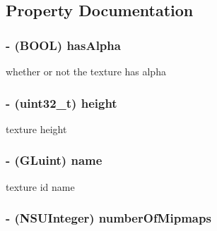 \subsection{Property Documentation}
\hypertarget{interface_c_c_texture_p_v_r_ae72c73a2de4c7c8db4484164a5e7c1ff}{
\subsubsection[{has\-Alpha}]{\setlength{\rightskip}{0pt plus 5cm}-\/ (B\-O\-O\-L) {\bf has\-Alpha}}}\label{interface_c_c_texture_p_v_r_ae72c73a2de4c7c8db4484164a5e7c1ff}
whether or not the texture has alpha \hypertarget{interface_c_c_texture_p_v_r_ac2bec2560bd2449e7d23d7ef843e37dc}{
\subsubsection[{height}]{\setlength{\rightskip}{0pt plus 5cm}-\/ (uint32\-\_\-t) {\bf height}}}\label{interface_c_c_texture_p_v_r_ac2bec2560bd2449e7d23d7ef843e37dc}
texture height \hypertarget{interface_c_c_texture_p_v_r_ac3b91de15322c3eabf041316595287bf}{
\subsubsection[{name}]{\setlength{\rightskip}{0pt plus 5cm}-\/ (G\-Luint) {\bf name}}}\label{interface_c_c_texture_p_v_r_ac3b91de15322c3eabf041316595287bf}
texture id name \hypertarget{interface_c_c_texture_p_v_r_ae6f06946b28736a3185a4b7a2bbbe92a}{
\subsubsection[{number\-Of\-Mipmaps}]{\setlength{\rightskip}{0pt plus 5cm}-\/ (N\-S\-U\-Integer) {\bf number\-Of\-Mipmaps}}}\label{interface_c_c_texture_p_v_r_ae6f06946b28736a3185a4b7a2bbbe92a}
